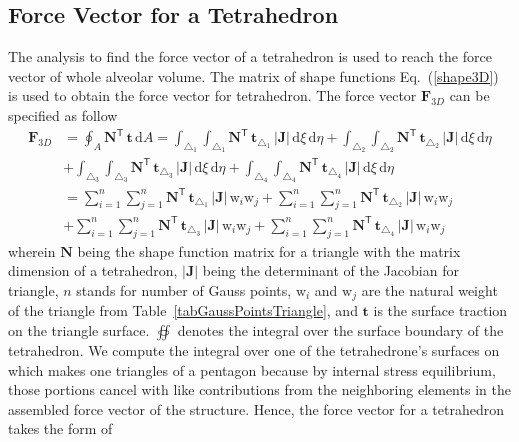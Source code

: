 \subsection{Force Vector for a Tetrahedron}

The analysis to find the force vector of a tetrahedron is used to reach the force vector of whole alveolar volume.
The matrix of shape functions Eq.~(\ref{shape3D}) is used to obtain the force vector for tetrahedron.
The force vector $\mathbf{F}_{3D}$ can be specified as follow
\begin{equation}
\begin{aligned}
\mathbf{F}_{3D} &= \oint_{A} \mathbf{N}^{\mathsf{T}} \, \mathbf{t} \, \mathrm{d} A = \int_{\triangle_{1}} \int_{\triangle_{1}} \mathbf{N}^{\mathsf{T}} \, \mathbf{t}_{\triangle_{1}} \,|\mathbf{J}| \, \mathrm{d} \xi \, \mathrm{d} \eta  + \int_{\triangle_{2}} \int_{\triangle_{2}} \mathbf{N}^{\mathsf{T}} \, \mathbf{t}_{\triangle_{2}} \,|\mathbf{J}| \, \mathrm{d} \xi \, \mathrm{d} \eta \\
& + \int_{\triangle_{3}} \int_{\triangle_{3}} \mathbf{N}^{\mathsf{T}} \, \mathbf{t}_{\triangle_{3}} \,|\mathbf{J}| \, \mathrm{d} \xi \, \mathrm{d} \eta + \int_{\triangle_{4}} \int_{\triangle_{4}} \mathbf{N}^{\mathsf{T}} \, \mathbf{t}_{\triangle_{4}} \,|\mathbf{J}| \, \mathrm{d} \xi \, \mathrm{d} \eta \\
& = \sum_{i=1}^{n} \sum_{j=1}^{n} \mathbf{N}^{\mathsf{T}} \, \mathbf{t}_{\triangle_{1}} \,|\mathbf{J}| \, \mathrm{w}_i \mathrm{w}_j + \sum_{i=1}^{n} \sum_{j=1}^{n} \mathbf{N}^{\mathsf{T}} \, \mathbf{t}_{\triangle_{2}} \,|\mathbf{J}| \, \mathrm{w}_i \mathrm{w}_j \\
& + \sum_{i=1}^{n} \sum_{j=1}^{n} \mathbf{N}^{\mathsf{T}} \, \mathbf{t}_{\triangle_{3}} \,|\mathbf{J}| \, \mathrm{w}_i \mathrm{w}_j + \sum_{i=1}^{n} \sum_{j=1}^{n} \mathbf{N}^{\mathsf{T}} \, \mathbf{t}_{\triangle_{4}} \,|\mathbf{J}| \, \mathrm{w}_i \mathrm{w}_j
\end{aligned}
\end{equation}
wherein $ \mathbf{N}$ being the shape function matrix for a triangle with the matrix dimension of a tetrahedron,  $|\mathbf{J}|$ being the determinant of the Jacobian for triangle, $n$ stands for number of Gauss points, $\mathrm{w}_i$ and $\mathrm{w}_j$ are the natural weight of the triangle from Table~\ref{tabGaussPointsTriangle}, and $\mathbf{t}$ is the surface traction on the triangle surface. $\oiint$ denotes the integral over the surface boundary of the tetrahedron. We compute the integral over one of the tetrahedrone's surfaces on which makes one triangles of a pentagon because by internal stress equilibrium, those portions cancel with like contributions from the neighboring elements in the assembled force vector of the structure. Hence, the force vector for a tetrahedron takes the form of

